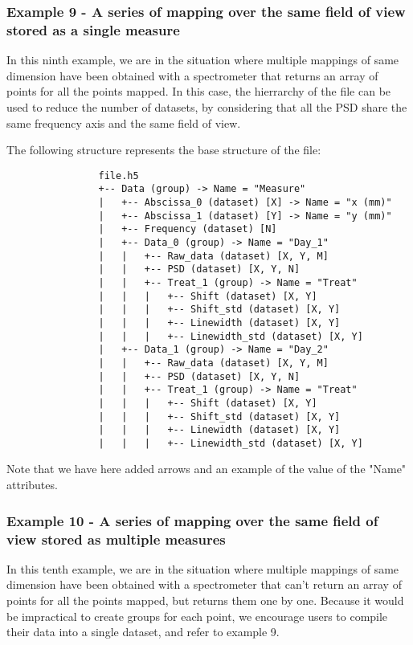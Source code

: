 \documentclass{article}
\begin{document}
        \subsubsection{Example 9 - A series of mapping over the same field of view stored as a single measure}
            In this ninth example, we are in the situation where multiple mappings of same dimension have been obtained with a spectrometer that returns an array of points for all the points mapped. In this case, the hierrarchy of the file can be used to reduce the number of datasets, by considering that all the PSD share the same frequency axis and the same field of view.

            The following structure represents the base structure of the file:
            \begin{verbatim}
                file.h5
                +-- Data (group) -> Name = "Measure"
                |   +-- Abscissa_0 (dataset) [X] -> Name = "x (mm)"
                |   +-- Abscissa_1 (dataset) [Y] -> Name = "y (mm)"
                |   +-- Frequency (dataset) [N]
                |   +-- Data_0 (group) -> Name = "Day_1"
                |   |   +-- Raw_data (dataset) [X, Y, M]
                |   |   +-- PSD (dataset) [X, Y, N]
                |   |   +-- Treat_1 (group) -> Name = "Treat"
                |   |   |   +-- Shift (dataset) [X, Y]
                |   |   |   +-- Shift_std (dataset) [X, Y]
                |   |   |   +-- Linewidth (dataset) [X, Y]
                |   |   |   +-- Linewidth_std (dataset) [X, Y]
                |   +-- Data_1 (group) -> Name = "Day_2"
                |   |   +-- Raw_data (dataset) [X, Y, M]
                |   |   +-- PSD (dataset) [X, Y, N]
                |   |   +-- Treat_1 (group) -> Name = "Treat"
                |   |   |   +-- Shift (dataset) [X, Y]
                |   |   |   +-- Shift_std (dataset) [X, Y]
                |   |   |   +-- Linewidth (dataset) [X, Y]
                |   |   |   +-- Linewidth_std (dataset) [X, Y]
            \end{verbatim}
            Note that we have here added arrows and an example of the value of the "Name" attributes.
        
        \subsubsection{Example 10 - A series of mapping over the same field of view stored as multiple measures}
            In this tenth example, we are in the situation where multiple mappings of same dimension have been obtained with a spectrometer that can't return an array of points for all the points mapped, but returns them one by one. Because it would be impractical to create groups for each point, we encourage users to compile their data into a single dataset, and refer to example 9.
        
\end{document}
